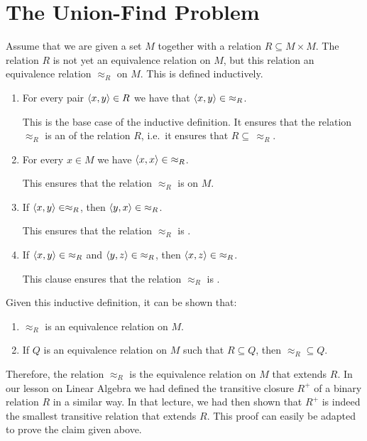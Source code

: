 \section{The Union-Find Problem}
Assume that we are given a set $M$ together with a relation $R \subseteq M \times M$.  The relation
$R$ is not yet an  equivalence relation on $M$, but this relation  an equivalence relation
$\approx_R$ on $M$.  This  is defined inductively.
\begin{enumerate}
\item For every pair $\pair(x,y) \in R$ we have that $\pair(x, y) \in\; \approx_R$.

      This is the base case of the inductive definition.  It ensures that the relation
      $\approx_R$ is an  of the relation $R$, i.e.~it ensures that $R \subseteq\, \approx_R$.
\item For every $x \in M$ we have $\pair(x,x) \in\; \approx_R$.

      This ensures that the relation $\approx_R$ is  on $M$.
\item If $\pair(x,y) \in \approx_R$, then $\pair(y,x) \in\; \approx_R$.

      This  ensures that the relation $\approx_R$ is .
\item If $\pair(x,y) \in\; \approx_R$ and $\pair(y,z) \in\; \approx_R$, then $\pair(x,z) \in\; \approx_R$.

      This clause ensures that the relation $\approx_R$ is .
\end{enumerate}
Given this inductive definition, it can be shown that:
\begin{enumerate}
\item $\approx_R$ is an equivalence relation on $M$.
\item If $Q$ is an equivalence relation on $M$ such that $R \subseteq Q$, then $\approx_R \subseteq Q$.
\end{enumerate}
Therefore, the relation $\approx_R$ is the 
equivalence relation on $M$ that extends $R$.  In our lesson on Linear
Algebra we had defined the transitive closure $R^+$ of a binary relation $R$ in a similar way.  In
that lecture, we had then shown that $R^+$ is indeed the smallest transitive relation that extends
$R$.  This proof can easily be adapted to prove the claim given above.

